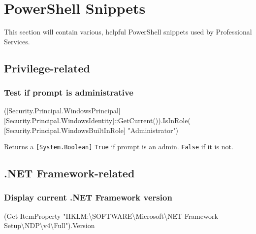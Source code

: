 \documentclass[
]{book}
\newenvironment{Shaded}{\begin{snugshade}}{\end{snugshade}}
\newcommand{\NormalTok}[1]{#1}
\begin{document}
\hypertarget{powershell-snippets}{%
\chapter{PowerShell Snippets}\label{powershell-snippets}}

This section will contain various, helpful PowerShell snippets used by Professional Services.

\hypertarget{privilege-related}{%
\section{Privilege-related}\label{privilege-related}}

\hypertarget{test-if-prompt-is-administrative}{%
\subsection{Test if prompt is administrative}\label{test-if-prompt-is-administrative}}

\begin{Shaded}
\begin{Highlighting}[]
\NormalTok{([Security.Principal.WindowsPrincipal] [Security.Principal.WindowsIdentity]::GetCurrent()).IsInRole( [Security.Principal.WindowsBuiltInRole] "Administrator")}
\end{Highlighting}
\end{Shaded}

Returns a \texttt{{[}System.Boolean{]}} \texttt{True} if prompt is an admin. \texttt{False} if it is not.

\hypertarget{net-framework-related}{%
\section{.NET Framework-related}\label{net-framework-related}}

\hypertarget{display-current-.net-framework-version}{%
\subsection{Display current .NET Framework version}\label{display-current-.net-framework-version}}

\begin{Shaded}
\begin{Highlighting}[]
\NormalTok{(Get{-}ItemProperty "HKLM:\textbackslash{}SOFTWARE\textbackslash{}Microsoft\textbackslash{}NET Framework Setup\textbackslash{}NDP\textbackslash{}v4\textbackslash{}Full").Version}
\end{Highlighting}
\end{Shaded}
\end{document}
